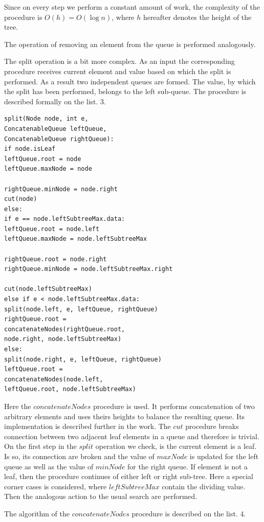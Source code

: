 \documentclass[conference]{IEEEtran}
\theoremstyle{plane}
\begin{document}
Since on every step we perform a constant amount of work, the complexity of the procedure is $O(h)=O(\log n)$, where $h$ hereafter denotes the height of the tree.

The operation of removing an element from the queue is performed analogously. 

The split operation is a bit more complex. As an input the corresponding procedure receives current element and value based on which the split is performed. As a result two independent queues are formed. The value, by which the split has been performed, belongs to the left sub-queue. The procedure is described formally on the list. 3.

\begin{lstlisting}[caption={Queue plit algorithm},captionpos=b]
split(Node node, int e, 
ConcatenableQueue leftQueue, 
ConcatenableQueue rightQueue): 
if node.isLeaf
leftQueue.root = node
leftQueue.maxNode = node	

rightQueue.minNode = node.right	
cut(node)
else:
if e == node.leftSubtreeMax.data:
leftQueue.root = node.left
leftQueue.maxNode = node.leftSubtreeMax

rightQueue.root = node.right
rightQueue.minNode = node.leftSubtreeMax.right

cut(node.leftSubtreeMax)
else if e < node.leftSubtreeMax.data:
split(node.left, e, leftQueue, rightQueue)
rightQueue.root =
concatenateNodes(rightQueue.root, 
node.right, node.leftSubtreeMax)
else:
split(node.right, e, leftQueue, rightQueue)
leftQueue.root = 
concatenateNodes(node.left, 
leftQueue.root, node.leftSubtreeMax)
\end{lstlisting}

Here the $concatenateNodes$ procedure is used. It performs concatenation of two arbitrary elements and uses theirs heights to balance the resulting queue. Its implementation is described further in the work. The $cut$ procedure breaks connection between two adjacent leaf elements in a queue and therefore is trivial. On the first step in the $split$ operation we check, is the current element is a leaf. Is so, its connection are broken and the value of $maxNode$ is updated for the left queue as well as the value of $minNode$ for the right queue. If element is not a leaf, then the procedure continues of either left or right sub-tree. Here a special corner cases is considered, where $leftSubtreeMax$ contain the dividing value. Then the analogous action to the usual search are performed.


The algorithm of the $concatenateNodes$ procedure is described on the list. 4.
\end{document}
